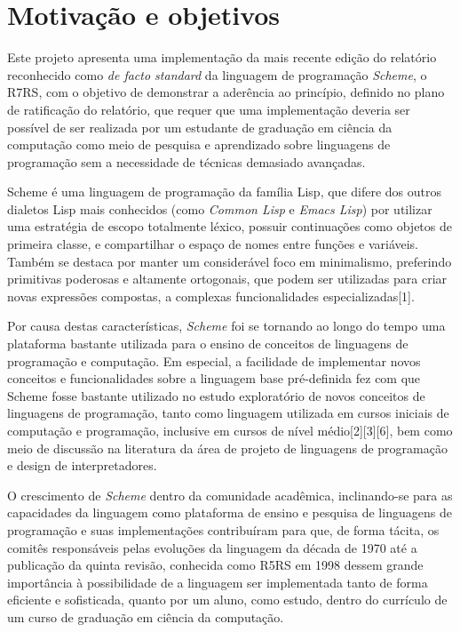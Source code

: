 \section{Motivação e objetivos}
\label{sec:motivacao}

Este projeto apresenta uma implementação da mais recente edição do relatório
reconhecido como \textit{de facto standard} da linguagem de programação
\textit{Scheme}, o \acs{R7RS}, com o objetivo de demonstrar a aderência ao
princípio, definido no plano de ratificação do relatório, que requer que uma
implementação deveria ser possível de ser realizada por um estudante de
graduação em ciência da computação como meio de pesquisa e aprendizado sobre
linguagens de programação sem a necessidade de técnicas demasiado avançadas.

Scheme é uma linguagem de programação da família Lisp, que difere dos outros
dialetos Lisp  mais conhecidos (como \textit{Common Lisp} e \textit{Emacs
Lisp}) por utilizar uma estratégia de escopo totalmente léxico, possuir
continuações como objetos de primeira classe, e compartilhar o espaço de nomes
entre funções e variáveis. Também se destaca por manter um considerável foco em
minimalismo, preferindo primitivas poderosas e altamente ortogonais, que podem
ser utilizadas para criar novas expressões compostas, a complexas
funcionalidades especializadas[1].

Por causa destas características, \textit{Scheme} foi se tornando ao longo do
tempo uma plataforma bastante utilizada para o ensino de conceitos de
linguagens de programação e computação. Em especial, a facilidade de
implementar novos conceitos e funcionalidades sobre a linguagem base
pré-definida fez com que Scheme fosse bastante utilizado no estudo exploratório
de novos conceitos de linguagens de programação, tanto como linguagem utilizada
em cursos iniciais de computação e programação, inclusive em cursos de nível
médio[2][3][6], bem como meio de discussão na literatura da área de projeto de
linguagens de programação e design de interpretadores.

O crescimento de \textit{Scheme} dentro da comunidade acadêmica, inclinando-se
para as capacidades da linguagem como plataforma de ensino e pesquisa de
linguagens de programação e suas implementações contribuíram para que, de forma
tácita, os comitês responsáveis pelas evoluções da linguagem da década de 1970
até a publicação da quinta revisão, conhecida como \acs{R5RS} em 1998 dessem
grande importância à possibilidade de a linguagem ser implementada tanto de
forma eficiente e sofisticada, quanto por um aluno, como estudo, dentro do
currículo de um curso de graduação em ciência da computação.

